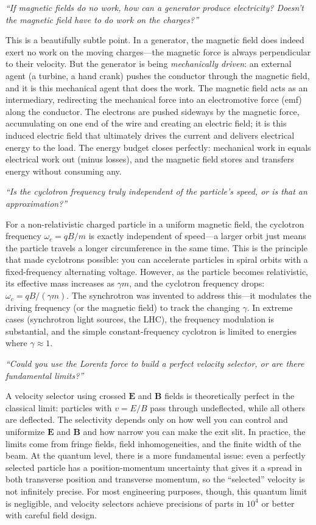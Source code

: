 \textit{``If magnetic fields do no work, how can a generator produce electricity? Doesn't the magnetic field have to do work on the charges?''}

This is a beautifully subtle point. In a generator, the magnetic field does indeed exert no work on the moving charges---the magnetic force is always perpendicular to their velocity. But the generator is being \emph{mechanically driven}: an external agent (a turbine, a hand crank) pushes the conductor through the magnetic field, and it is this mechanical agent that does the work. The magnetic field acts as an intermediary, redirecting the mechanical force into an electromotive force (emf) along the conductor. The electrons are pushed sideways by the magnetic force, accumulating on one end of the wire and creating an electric field; it is this induced electric field that ultimately drives the current and delivers electrical energy to the load. The energy budget closes perfectly: mechanical work in equals electrical work out (minus losses), and the magnetic field stores and transfers energy without consuming any.

\textit{``Is the cyclotron frequency truly independent of the particle's speed, or is that an approximation?''}

For a non-relativistic charged particle in a uniform magnetic field, the cyclotron frequency $\omega_c = qB/m$ is exactly independent of speed---a larger orbit just means the particle travels a longer circumference in the same time. This is the principle that made cyclotrons possible: you can accelerate particles in spiral orbits with a fixed-frequency alternating voltage. However, as the particle becomes relativistic, its effective mass increases as $\gamma m$, and the cyclotron frequency drops: $\omega_c = qB/(\gamma m)$. The synchrotron was invented to address this---it modulates the driving frequency (or the magnetic field) to track the changing $\gamma$. In extreme cases (synchrotron light sources, the LHC), the frequency modulation is substantial, and the simple constant-frequency cyclotron is limited to energies where $\gamma \approx 1$.

\textit{``Could you use the Lorentz force to build a perfect velocity selector, or are there fundamental limits?''}

A velocity selector using crossed $\mathbf{E}$ and $\mathbf{B}$ fields is theoretically perfect in the classical limit: particles with $v = E/B$ pass through undeflected, while all others are deflected. The selectivity depends only on how well you can control and uniformize $\mathbf{E}$ and $\mathbf{B}$ and how narrow you can make the exit slit. In practice, the limits come from fringe fields, field inhomogeneities, and the finite width of the beam. At the quantum level, there is a more fundamental issue: even a perfectly selected particle has a position-momentum uncertainty that gives it a spread in both transverse position and transverse momentum, so the ``selected'' velocity is not infinitely precise. For most engineering purposes, though, this quantum limit is negligible, and velocity selectors achieve precisions of parts in $10^4$ or better with careful field design.

